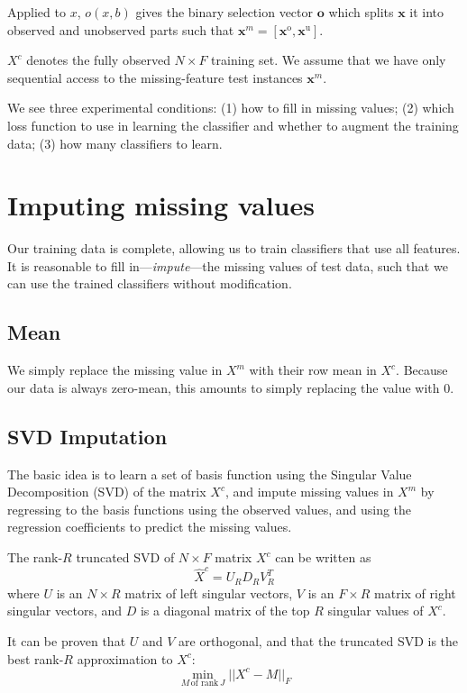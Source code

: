Applied to $x$, $o(x, b)$ gives the binary selection vector $\mathbf{o}$ which splits $\mathbf{x}$ it into observed and unobserved parts such that $\mathbf{x}^m = [\mathbf{x}^\text{o}, \mathbf{x}^\text{u}]$.

$X^c$ denotes the fully observed $N \times F$ training set.
We assume that we have only sequential access to the missing-feature test instances $\mathbf{x}^m$.

We see three experimental conditions: (1) how to fill in missing values; (2) which loss function to use in learning the classifier and whether to augment the training data; (3) how many classifiers to learn.

\section{Imputing missing values}
Our training data is complete, allowing us to train classifiers that use all features.
It is reasonable to fill in---\emph{impute}---the missing values of test data, such that we can use the trained classifiers without modification.

\subsection{Mean}
We simply replace the missing value in $X^m$ with their row mean in $X^c$.
Because our data is always zero-mean, this amounts to simply replacing the value with $0$.

\subsection{SVD Imputation}
The basic idea is to learn a set of basis function using the Singular Value Decomposition (SVD) of the matrix $X^c$, and impute missing values in $X^m$ by regressing to the basis functions using the observed values, and using the regression coefficients to predict the missing values.

The rank-$R$ truncated SVD of $N \times F$ matrix $X^c$ can be written as
\begin{equation}
\hat{X}^c = U_R D_R V_R^T
\end{equation}
where $U$ is an $N \times R$ matrix of left singular vectors, $V$ is an $F \times R$ matrix of right singular vectors, and $D$ is a diagonal matrix of the top $R$ singular values of $X^c$.

It can be proven \cite{Hopcroft-book-2013} that $U$ and $V$ are orthogonal, and that the truncated SVD is the best rank-$R$ approximation to $X^c$:
\begin{equation}
\min_{M\,\text{of rank}\,J} || X^c - M ||_F
\end{equation}

